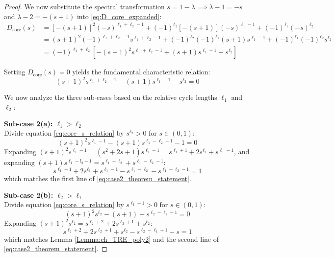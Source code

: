\begin{proof}
We now substitute the spectral transformation $s = 1 - \lambda \implies \lambda - 1 = -s$ and $\lambda - 2 = -(s+1)$ into \eqref{eq:D_core_expanded}:
\begin{align}
	D_{\text{core}}(s) &= [-(s+1)]^2 (-s)^{\ell_1+\ell_2-1} + (-1)^{\ell_2}[-(s+1)](-s)^{\ell_1-1} + (-1)^{\ell_1}(-s)^{\ell_2} \nonumber \\
	&= (s+1)^2 (-1)^{\ell_1+\ell_2-1} s^{\ell_1+\ell_2-1} + (-1)^{\ell_2} (-1)^{\ell_1} (s+1) s^{\ell_1-1} + (-1)^{\ell_1} (-1)^{\ell_2} s^{\ell_2} \nonumber \\
	&= (-1)^{\ell_1+\ell_2} \left[ -(s+1)^2 s^{\ell_1+\ell_2-1} + (s+1) s^{\ell_1-1} + s^{\ell_2} \right]
\end{align}

Setting $D_{\text{core}}(s) = 0$ yields the fundamental characteristic relation:
\begin{equation}\label{eq:core_s_relation}
	(s+1)^2 s^{\ell_1+\ell_2-1} - (s+1) s^{\ell_1-1} - s^{\ell_2} = 0
\end{equation}

We now analyze the three sub-cases based on the relative cycle lengths $\ell_1$ and $\ell_2$:

\vspace{0.5em}
\textbf{Sub-case 2(a): $\ell_1 > \ell_2$}\\
Divide equation \eqref{eq:core_s_relation} by $s^{\ell_2} > 0$ for $s \in (0,1)$:
\begin{equation}
	(s+1)^2 s^{\ell_1-1} - (s+1) s^{\ell_1-\ell_2-1} - 1 = 0
\end{equation}
Expanding $(s+1)^2 s^{\ell_1-1} = (s^2 + 2s + 1) s^{\ell_1-1} = s^{\ell_1+1} + 2s^{\ell_1} + s^{\ell_1-1}$, and expanding $(s+1) s^{\ell_1-l_2-1} = s^{\ell_1-\ell_2} + s^{\ell_1-\ell_2-1}$:
\begin{equation}
	s^{\ell_1+1} + 2s^{\ell_1} + s^{\ell_1-1} - s^{\ell_1-\ell_2} - s^{\ell_1-\ell_2-1} = 1
\end{equation}
which matches the first line of \eqref{eq:case2_theorem_statement}.

\vspace{0.5em}
\textbf{Sub-case 2(b): $\ell_2 > \ell_1$}\\
Divide equation \eqref{eq:core_s_relation} by $s^{\ell_1-1} > 0$ for $s \in (0,1)$:
\begin{equation}
	(s+1)^2 s^{\ell_2} - (s+1) - s^{\ell_2-\ell_1+1} = 0
\end{equation}
Expanding $(s+1)^2 s^{\ell_2} = s^{\ell_2+2} + 2s^{\ell_2+1} + s^{\ell_2}$:
\begin{equation}
	s^{\ell_2+2} + 2s^{\ell_2+1} + s^{\ell_2} - s^{\ell_2-\ell_1+1} - s = 1
\end{equation}
which matches Lemma \ref{Lemma:ch_TRE_poly2} and the second line of \eqref{eq:case2_theorem_statement}.


\end{proof}
